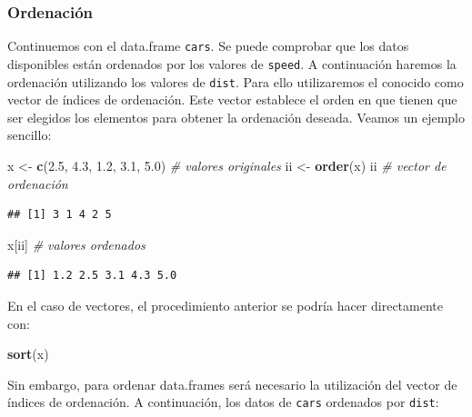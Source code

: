 \documentclass[]{book}
\newenvironment{Shaded}{\begin{snugshade}}{\end{snugshade}}
\newcommand{\CommentTok}[1]{\textcolor[rgb]{0.56,0.35,0.01}{\textit{#1}}}
\newcommand{\FloatTok}[1]{\textcolor[rgb]{0.00,0.00,0.81}{#1}}
\newcommand{\KeywordTok}[1]{\textcolor[rgb]{0.13,0.29,0.53}{\textbf{#1}}}
\newcommand{\NormalTok}[1]{#1}
\newcommand{\StringTok}[1]{\textcolor[rgb]{0.31,0.60,0.02}{#1}}
\begin{document}
\hypertarget{ordenacion}{%
\subsubsection{Ordenación}\label{ordenacion}}

Continuemos con el data.frame \texttt{cars}.
Se puede comprobar que los datos disponibles están ordenados por
los valores de \texttt{speed}. A continuación haremos la ordenación utilizando
los valores de \texttt{dist}. Para ello utilizaremos el conocido como vector de
índices de ordenación.
Este vector establece el orden en que tienen que ser elegidos los
elementos para obtener la ordenación deseada.
Veamos un ejemplo sencillo:

\begin{Shaded}
\begin{Highlighting}[]
\NormalTok{x <-}\StringTok{ }\KeywordTok{c}\NormalTok{(}\FloatTok{2.5}\NormalTok{, }\FloatTok{4.3}\NormalTok{, }\FloatTok{1.2}\NormalTok{, }\FloatTok{3.1}\NormalTok{, }\FloatTok{5.0}\NormalTok{) }\CommentTok{# valores originales}
\NormalTok{ii <-}\StringTok{ }\KeywordTok{order}\NormalTok{(x)}
\NormalTok{ii    }\CommentTok{# vector de ordenación}
\end{Highlighting}
\end{Shaded}

\begin{verbatim}
## [1] 3 1 4 2 5
\end{verbatim}

\begin{Shaded}
\begin{Highlighting}[]
\NormalTok{x[ii] }\CommentTok{# valores ordenados}
\end{Highlighting}
\end{Shaded}

\begin{verbatim}
## [1] 1.2 2.5 3.1 4.3 5.0
\end{verbatim}

En el caso de vectores, el procedimiento anterior se podría
hacer directamente con:

\begin{Shaded}
\begin{Highlighting}[]
\KeywordTok{sort}\NormalTok{(x)}
\end{Highlighting}
\end{Shaded}

Sin embargo, para ordenar data.frames será necesario la utilización del
vector de índices de ordenación. A continuación, los datos de \texttt{cars}
ordenados por \texttt{dist}:
\end{document}

